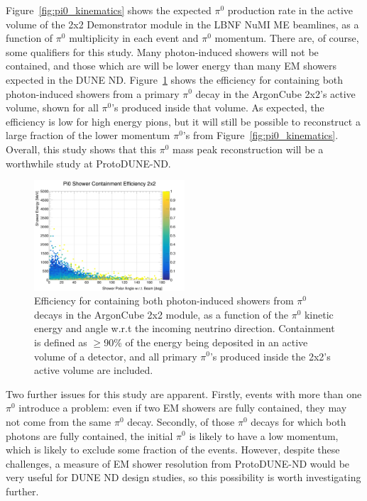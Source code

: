 Figure~\ref{fig:pi0_kinematics} shows the expected $\pi^{0}$ production rate in the active volume of the 2x2 Demonstrator module in the LBNF NuMI ME beamlines, as a function of $\pi^{0}$ multiplicity in each event and $\pi^{0}$ momentum. There are, of course, some qualifiers for this study. Many photon-induced showers will not be contained, and those which are will be lower energy than many EM showers expected in the DUNE ND. Figure~\ref{fig:pi0_containment_2x2} shows the efficiency for containing both photon-induced showers from a primary $\pi^{0}$ decay in the ArgonCube 2x2's active volume, shown for all $\pi^{0}$'s produced inside that volume. As expected, the efficiency is low for high energy pions, but it will still be possible to reconstruct a large fraction of the lower momentum $\pi^{0}$'s from Figure~\ref{fig:pi0_kinematics}. Overall, this study shows that this $\pi^{0}$ mass peak reconstruction will be a worthwhile study at ProtoDUNE-ND.

\begin{figure}[htb]
  \centering
  \includegraphics[width=0.5\textwidth]{plots/2x2_minerva_plots/Pi0_cont_eff_2x2.png}
  \caption{Efficiency for containing both photon-induced showers from $\pi^{0}$ decays in the ArgonCube 2x2 module, as a function of the $\pi^{0}$ kinetic energy and angle w.r.t the incoming neutrino direction. Containment is defined as $\geq$90\% of the energy being deposited in an active volume of a detector, and all primary $\pi^{0}$'s produced inside the 2x2's active volume are included.}
  \label{fig:pi0_containment_2x2}
\end{figure}
Two further issues for this study are apparent. Firstly, events with more than one $\pi^{0}$ introduce a problem: even if two EM showers are fully contained, they may not come from the same $\pi^{0}$ decay. Secondly, of those $\pi^{0}$ decays for which both photons are fully contained, the initial $\pi^{0}$ is likely to have a low momentum, which is likely to exclude some fraction of the events. However, despite these challenges, a measure of EM shower resolution from ProtoDUNE-ND would be very useful for DUNE ND design studies, so this possibility is worth investigating further.

